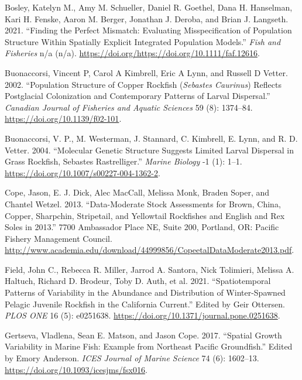 \documentclass[11pt,
  english,
  letterpaper,
]{article}
\begin{document}
\leavevmode\hypertarget{ref-Bosleyetal_mismatch_2021}{}%
Bosley, Katelyn M., Amy M. Schueller, Daniel R. Goethel, Dana H. Hanselman, Kari H. Fenske, Aaron M. Berger, Jonathan J. Deroba, and Brian J. Langseth. 2021. ``Finding the Perfect Mismatch: Evaluating Misspecification of Population Structure Within Spatially Explicit Integrated Population Models.'' \emph{Fish and Fisheries} n/a (n/a). \url{https://doi.org/https://doi.org/10.1111/faf.12616}.

\leavevmode\hypertarget{ref-buonaccorsi_population_2002}{}%
Buonaccorsi, Vincent P, Carol A Kimbrell, Eric A Lynn, and Russell D Vetter. 2002. ``Population Structure of Copper Rockfish (\emph{Sebastes Caurinus}) Reflects Postglacial Colonization and Contemporary Patterns of Larval Dispersal.'' \emph{Canadian Journal of Fisheries and Aquatic Sciences} 59 (8): 1374--84. \url{https://doi.org/10.1139/f02-101}.

\leavevmode\hypertarget{ref-buonaccorsi_molecular_2004}{}%
Buonaccorsi, V. P., M. Westerman, J. Stannard, C. Kimbrell, E. Lynn, and R. D. Vetter. 2004. ``Molecular Genetic Structure Suggests Limited Larval Dispersal in Grass Rockfish, Sebastes Rastrelliger.'' \emph{Marine Biology} -1 (1): 1--1. \url{https://doi.org/10.1007/s00227-004-1362-2}.

\leavevmode\hypertarget{ref-cope_data-moderate_2013}{}%
Cope, Jason, E. J. Dick, Alec MacCall, Melissa Monk, Braden Soper, and Chantel Wetzel. 2013. ``Data-Moderate Stock Assessments for Brown, China, Copper, Sharpchin, Stripetail, and Yellowtail Rockfishes and English and Rex Soles in 2013.'' 7700 Ambassador Place NE, Suite 200, Portland, OR: Pacific Fishery Management Council. \url{http://www.academia.edu/download/44999856/CopeetalDataModerate2013.pdf}.

\leavevmode\hypertarget{ref-field_spatiotemporal_2021}{}%
Field, John C., Rebecca R. Miller, Jarrod A. Santora, Nick Tolimieri, Melissa A. Haltuch, Richard D. Brodeur, Toby D. Auth, et al. 2021. ``Spatiotemporal Patterns of Variability in the Abundance and Distribution of Winter-Spawned Pelagic Juvenile Rockfish in the California Current.'' Edited by Geir Ottersen. \emph{PLOS ONE} 16 (5): e0251638. \url{https://doi.org/10.1371/journal.pone.0251638}.

\leavevmode\hypertarget{ref-gertseva_spatial_2017}{}%
Gertseva, Vladlena, Sean E. Matson, and Jason Cope. 2017. ``Spatial Growth Variability in Marine Fish: Example from Northeast Pacific Groundfish.'' Edited by Emory Anderson. \emph{ICES Journal of Marine Science} 74 (6): 1602--13. \url{https://doi.org/10.1093/icesjms/fsx016}.
\end{document}
